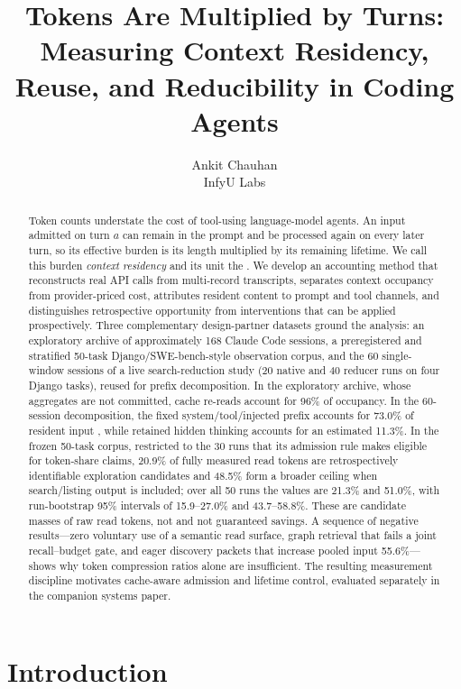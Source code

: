 \documentclass[10pt,twocolumn]{article}
\title{\vspace{-1.2em}\textbf{Tokens Are Multiplied by Turns:}\\
\Large Measuring Context Residency, Reuse, and Reducibility in Coding Agents}
\author{Ankit Chauhan\\\small InfyU Labs}
\date{}
\begin{document}
\maketitle
\thispagestyle{fancy}

\begin{abstract}
Token counts understate the cost of tool-using language-model agents.  An input admitted on turn $a$
can remain in the prompt and be processed again on every later turn, so its effective burden is its
length multiplied by its remaining lifetime.  We call this burden \emph{context residency} and its
unit the \tokensturn.  We develop an accounting method that reconstructs real API calls from
multi-record transcripts, separates context occupancy from provider-priced cost, attributes resident
content to prompt and tool channels, and distinguishes retrospective opportunity from interventions
that can be applied prospectively.  Three complementary design-partner datasets ground the analysis:
an exploratory archive of approximately 168 Claude Code sessions, a preregistered and stratified
50-task Django/SWE-bench-style observation corpus, and the 60 single-window sessions of a live
search-reduction study (20 native and 40 reducer runs on four Django tasks), reused for prefix
decomposition.  In the exploratory archive, whose aggregates are not committed, cache re-reads
account for 96\% of occupancy.  In the 60-session decomposition, the fixed system/tool/injected prefix
accounts for 73.0\% of resident input \tokensturns, while retained hidden thinking accounts for an
estimated 11.3\%.  In the frozen 50-task corpus, restricted to the 30 runs that its admission rule makes
eligible for token-share claims, 20.9\% of fully measured read tokens are retrospectively identifiable
exploration candidates and 48.5\% form a broader ceiling when search/listing output is included; over
all 50 runs the values are 21.3\% and 51.0\%, with run-bootstrap 95\% intervals of 15.9--27.0\% and
43.7--58.8\%.  These are candidate masses of raw read tokens, not \tokensturns{} and not guaranteed
savings.  A sequence of negative results---zero voluntary use of a semantic read surface,
graph retrieval that fails a joint recall--budget gate, and eager discovery packets that increase
pooled input 55.6\%---shows why token compression ratios alone are insufficient.  The resulting
measurement discipline motivates cache-aware admission and lifetime control, evaluated separately
in the companion systems paper.
\end{abstract}

\section{Introduction}
\end{document}
